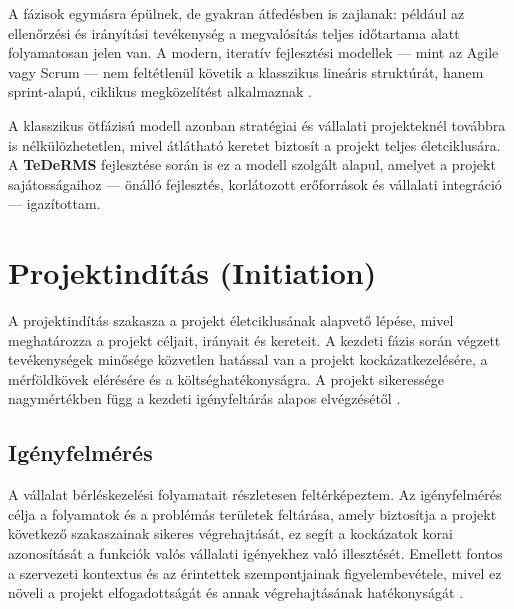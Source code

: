 A fázisok egymásra épülnek, de gyakran átfedésben is zajlanak: például az ellenőrzési és irányítási tevékenység a megvalósítás teljes időtartama alatt folyamatosan jelen van. 
A modern, iteratív fejlesztési modellek — mint az Agile vagy Scrum — nem feltétlenül követik a klasszikus lineáris struktúrát, 
hanem sprint-alapú, ciklikus megközelítést alkalmaznak \cite{Hajdu2014,Kaposi2019}.

A klasszikus ötfázisú modell azonban stratégiai és vállalati projekteknél továbbra is nélkülözhetetlen, 
mivel átlátható keretet biztosít a projekt teljes életciklusára. 
A \textbf{TeDeRMS} fejlesztése során is ez a modell szolgált alapul, amelyet a projekt sajátosságaihoz — önálló fejlesztés, korlátozott erőforrások és vállalati integráció — igazítottam.

\section{Projektindítás (Initiation)}

A projektindítás szakasza a projekt életciklusának alapvető lépése, mivel meghatározza a projekt céljait, irányait és kereteit. 
A kezdeti fázis során végzett tevékenységek minősége közvetlen hatással van a projekt kockázatkezelésére, a mérföldkövek elérésére és a költséghatékonyságra. 
A projekt sikeressége nagymértékben függ a kezdeti igényfeltárás alapos elvégzésétől \cite{Hajdu2014,Szalay2018,Kovacs2016,Kaposi2019}.

\subsection{Igényfelmérés}

A vállalat bérléskezelési folyamatait részletesen feltérképeztem.
Az igényfelmérés célja a folyamatok és a problémás területek feltárása, amely biztosítja a projekt következő szakaszainak sikeres végrehajtását, 
ez segít a kockázatok korai azonosítását a funkciók valós vállalati igényekhez való illesztését.  
Emellett fontos a szervezeti kontextus és az érintettek szempontjainak figyelembevétele, mivel ez növeli a projekt elfogadottságát és annak végrehajtásának hatékonyságát \cite{Kovacs2016,Kaposi2019}.

